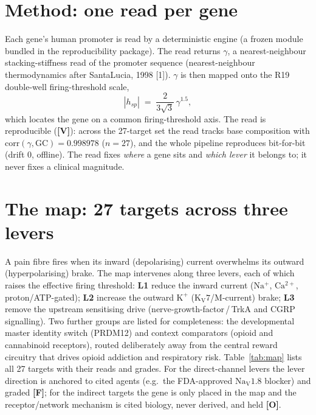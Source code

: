 \documentclass[11pt]{article}
\newcommand{\gV}{\textcolor{gv}{\textbf{[V]}}}
\newcommand{\gF}{\textcolor{gf}{\textbf{[F]}}}
\newcommand{\gO}{\textcolor{go}{\textbf{[O]}}}
\begin{document}
\section{Method: one read per gene}
Each gene's human promoter is read by a deterministic engine (a frozen module bundled in the reproducibility package). The read returns $\gamma$, a nearest-neighbour stacking-stiffness read of the promoter sequence (nearest-neighbour thermodynamics after SantaLucia, 1998 [1]). $\gamma$ is then mapped onto the R19 double-well firing-threshold scale,
\begin{equation}
|h_{sp}| \;=\; \frac{2}{3\sqrt{3}}\,\gamma^{1.5},
\end{equation}
which locates the gene on a common firing-threshold axis. The read is reproducible (\gV{}): across the 27-target set the read tracks base composition with $\mathrm{corr}(\gamma,\mathrm{GC})=0.998978$ ($n=27$), and the whole pipeline reproduces bit-for-bit (drift $0$, offline). The read fixes \emph{where} a gene sits and \emph{which lever} it belongs to; it never fixes a clinical magnitude.

\section{The map: 27 targets across three levers}
A pain fibre fires when its inward (depolarising) current overwhelms its outward (hyperpolarising) brake. The map intervenes along three levers, each of which raises the effective firing threshold: \textbf{L1} reduce the inward current ($\mathrm{Na^+}$, $\mathrm{Ca^{2+}}$, proton/ATP-gated); \textbf{L2} increase the outward $\mathrm{K^+}$ ($\mathrm{K_V}7$/M-current) brake; \textbf{L3} remove the upstream sensitising drive (nerve-growth-factor\,/\,TrkA and CGRP signalling). Two further groups are listed for completeness: the developmental master identity switch (PRDM12) and context comparators (opioid and cannabinoid receptors), routed deliberately away from the central reward circuitry that drives opioid addiction and respiratory risk. Table~\ref{tab:map} lists all 27 targets with their reads and grades. For the direct-channel levers the lever direction is anchored to cited agents (e.g.\ the FDA-approved $\mathrm{Na_V}1.8$ blocker) and graded \gF{}; for the indirect targets the gene is only placed in the map and the receptor/network mechanism is cited biology, never derived, and held \gO{}.
\end{document}
